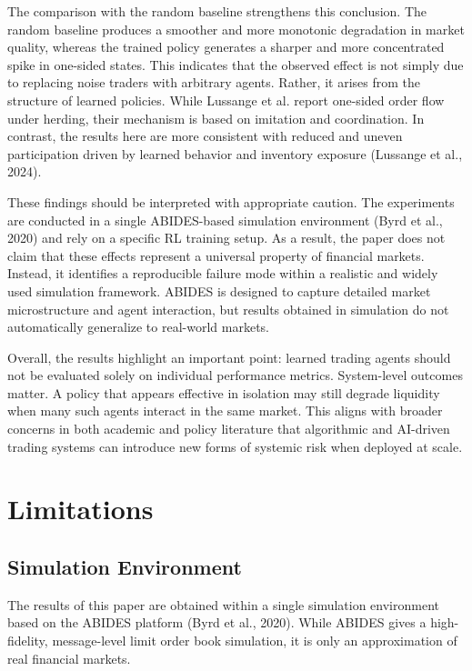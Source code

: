 \documentclass[11pt]{article}
\begin{document}
The comparison with the random baseline strengthens this conclusion. The random baseline produces a smoother and more monotonic degradation in market quality, whereas the trained policy generates a sharper and more concentrated spike in one-sided states. This indicates that the observed effect is not simply due to replacing noise traders with arbitrary agents. Rather, it arises from the structure of learned policies. While Lussange et al. report one-sided order flow under herding, their mechanism is based on imitation and coordination. In contrast, the results here are more consistent with reduced and uneven participation driven by learned behavior and inventory exposure (Lussange et al., 2024).

These findings should be interpreted with appropriate caution. The experiments are conducted in a single ABIDES-based simulation environment (Byrd et al., 2020) and rely on a specific RL training setup. As a result, the paper does not claim that these effects represent a universal property of financial markets. Instead, it identifies a reproducible failure mode within a realistic and widely used simulation framework. ABIDES is designed to capture detailed market microstructure and agent interaction, but results obtained in simulation do not automatically generalize to real-world markets.

Overall, the results highlight an important point: learned trading agents should not be evaluated solely on individual performance metrics. System-level outcomes matter. A policy that appears effective in isolation may still degrade liquidity when many such agents interact in the same market. This aligns with broader concerns in both academic and policy literature that algorithmic and AI-driven trading systems can introduce new forms of systemic risk when deployed at scale.

\section{Limitations}

\subsection{Simulation Environment}

The results of this paper are obtained within a single simulation environment based on the ABIDES platform (Byrd et al., 2020). While ABIDES gives a high-fidelity, message-level limit order book simulation, it is only an approximation of real financial markets.
\end{document}
